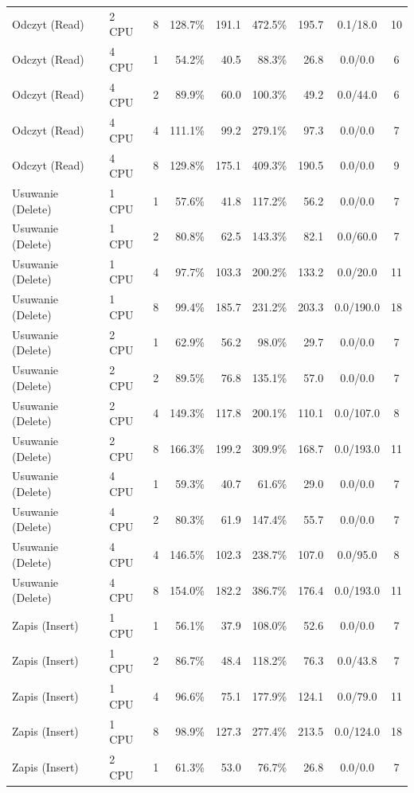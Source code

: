 \begin{table}[ht]
{\begin{tabular}{llcrrrrcc}
Odczyt (Read) & 2 CPU & 8 & 128.7\% & 191.1 & 472.5\% & 195.7 & 0.1/18.0 & 10 \\
Odczyt (Read) & 4 CPU & 1 & 54.2\% & 40.5 & 88.3\% & 26.8 & 0.0/0.0 & 6 \\
Odczyt (Read) & 4 CPU & 2 & 89.9\% & 60.0 & 100.3\% & 49.2 & 0.0/44.0 & 6 \\
Odczyt (Read) & 4 CPU & 4 & 111.1\% & 99.2 & 279.1\% & 97.3 & 0.0/0.0 & 7 \\
Odczyt (Read) & 4 CPU & 8 & 129.8\% & 175.1 & 409.3\% & 190.5 & 0.0/0.0 & 9 \\
Usuwanie (Delete) & 1 CPU & 1 & 57.6\% & 41.8 & 117.2\% & 56.2 & 0.0/0.0 & 7 \\
Usuwanie (Delete) & 1 CPU & 2 & 80.8\% & 62.5 & 143.3\% & 82.1 & 0.0/60.0 & 7 \\
Usuwanie (Delete) & 1 CPU & 4 & 97.7\% & 103.3 & 200.2\% & 133.2 & 0.0/20.0 & 11 \\
Usuwanie (Delete) & 1 CPU & 8 & 99.4\% & 185.7 & 231.2\% & 203.3 & 0.0/190.0 & 18 \\
Usuwanie (Delete) & 2 CPU & 1 & 62.9\% & 56.2 & 98.0\% & 29.7 & 0.0/0.0 & 7 \\
Usuwanie (Delete) & 2 CPU & 2 & 89.5\% & 76.8 & 135.1\% & 57.0 & 0.0/0.0 & 7 \\
Usuwanie (Delete) & 2 CPU & 4 & 149.3\% & 117.8 & 200.1\% & 110.1 & 0.0/107.0 & 8 \\
Usuwanie (Delete) & 2 CPU & 8 & 166.3\% & 199.2 & 309.9\% & 168.7 & 0.0/193.0 & 11 \\
Usuwanie (Delete) & 4 CPU & 1 & 59.3\% & 40.7 & 61.6\% & 29.0 & 0.0/0.0 & 7 \\
Usuwanie (Delete) & 4 CPU & 2 & 80.3\% & 61.9 & 147.4\% & 55.7 & 0.0/0.0 & 7 \\
Usuwanie (Delete) & 4 CPU & 4 & 146.5\% & 102.3 & 238.7\% & 107.0 & 0.0/95.0 & 8 \\
Usuwanie (Delete) & 4 CPU & 8 & 154.0\% & 182.2 & 386.7\% & 176.4 & 0.0/193.0 & 11 \\
Zapis (Insert) & 1 CPU & 1 & 56.1\% & 37.9 & 108.0\% & 52.6 & 0.0/0.0 & 7 \\
Zapis (Insert) & 1 CPU & 2 & 86.7\% & 48.4 & 118.2\% & 76.3 & 0.0/43.8 & 7 \\
Zapis (Insert) & 1 CPU & 4 & 96.6\% & 75.1 & 177.9\% & 124.1 & 0.0/79.0 & 11 \\
Zapis (Insert) & 1 CPU & 8 & 98.9\% & 127.3 & 277.4\% & 213.5 & 0.0/124.0 & 18 \\
Zapis (Insert) & 2 CPU & 1 & 61.3\% & 53.0 & 76.7\% & 26.8 & 0.0/0.0 & 7 \\

\end{tabular}}
\end{table}
